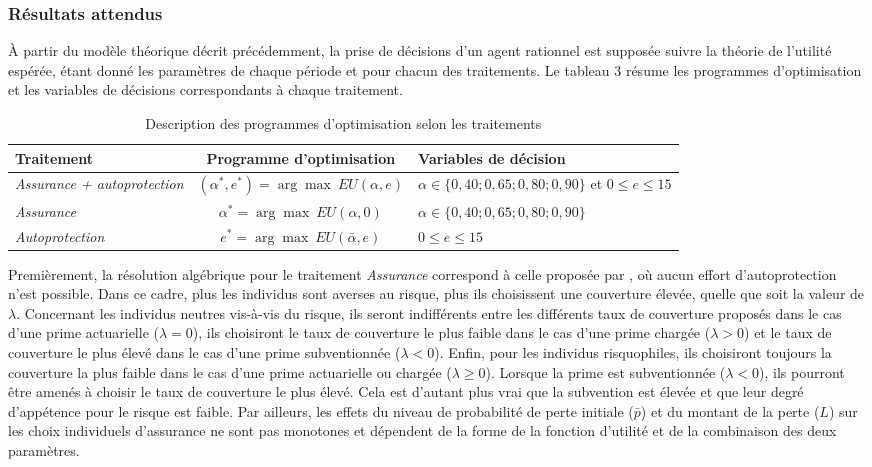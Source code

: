 \begin{Article}
\begin{refsection}[Mouminoux]
\subsubsection{Résultats attendus}

À partir du modèle théorique décrit précédemment, la prise de décisions d'un agent rationnel est supposée suivre la théorie de l'utilité espérée, étant donné les paramètres de chaque période et pour chacun des traitements. Le tableau 3 résume les programmes d'optimisation et les variables de décisions correspondants à chaque traitement.


\begin{table}[h!]
  \caption{Description des programmes d'optimisation selon les traitements}
    \label{tab:treatment_opti} 
  \begin{tabular}[c]{lcC{3cm}}
    \toprule
           Traitement & Programme d'optimisation & Variables de décision \\
    \midrule
    \textit{Assurance + autoprotection} & $(\alpha^*,e^*) = \arg\max~EU(\alpha,e)$ & $\alpha \in \{0,40;0,65;0,80;0,90\}$ et $0 \le e \le 15$ \\
    \textit{Assurance} & $\alpha^* = \arg\max~EU(\alpha,0)$ &$ \alpha \in \{0,40;0,65;0,80;0,90\}$\\
    \textit{Autoprotection} & $e^* = \arg\max~EU(\bar{\alpha} ,e)$ &  $0 \le e \le 15$\\\bottomrule
    \end{tabular}
\end{table}

Premièrement, la résolution algébrique pour le traitement \textit{Assurance} correspond à celle proposée par \textcite{s00}, où aucun effort d'autoprotection n'est possible. Dans ce cadre, plus les individus sont averses au risque, plus ils choisissent une couverture élevée, quelle que soit la valeur de $\lambda$. Concernant les individus neutres vis-à-vis du risque, ils seront indifférents entre les différents taux de couverture proposés dans le cas d'une prime actuarielle ($\lambda=0$), ils choisiront le taux de couverture le plus faible dans le cas d'une prime chargée ($\lambda>0$) et le taux de couverture le plus élevé dans le cas d'une prime subventionnée ($\lambda<0$). Enfin, pour les individus risquophiles, ils choisiront toujours la couverture la plus faible dans le cas d'une prime actuarielle ou chargée ($\lambda \geq 0$). Lorsque la prime est subventionnée ($\lambda < 0$), ils pourront être amenés à choisir le taux de couverture le plus élevé. Cela est d'autant plus vrai que la subvention est élevée et que leur degré d'appétence pour le risque est faible. Par ailleurs, les effets du niveau de probabilité de perte initiale ($\bar{p}$) et du montant de la perte ($L$) sur les choix individuels d'assurance ne sont pas monotones et dépendent de la forme de la fonction d'utilité et de la combinaison des deux paramètres.
 

\end{refsection}
\end{Article}
